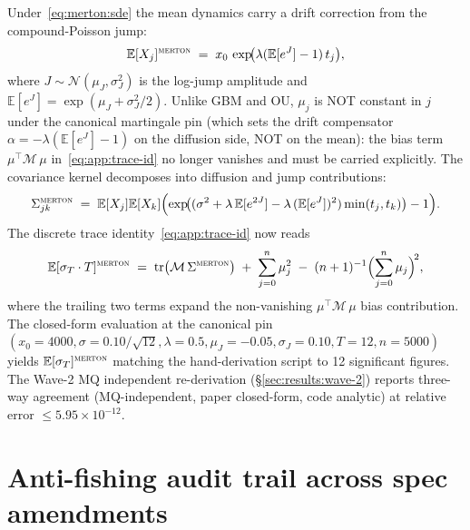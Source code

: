 \documentclass[11pt,letterpaper]{article}
\newcommand{\E}{\mathbb{E}}
\newcommand{\sigmaT}{\sigma_{T}}
\newcommand{\centerProj}{\mathcal{M}}
\begin{document}
Under~\eqref{eq:merton:sde} the mean dynamics carry a drift correction
from the compound-Poisson jump:
\begin{equation}
    \E[X_{j}]^{\textsc{merton}}
    \;=\;
    x_{0}\,\exp\!\bigl(\lambda(\E[e^{J}] - 1)\,t_{j}\bigr),
    \label{eq:app:merton-mean-j}
\end{equation}
where $J \sim \mathcal{N}(\mu_{J}, \sigma_{J}^{2})$ is the log-jump
amplitude and $\E[e^{J}] = \exp(\mu_{J} + \sigma_{J}^{2}/2)$. Unlike
GBM and OU, $\mu_{j}$ is NOT constant in $j$ under the canonical
martingale pin (which sets the drift compensator
$\alpha = -\lambda(\E[e^{J}] - 1)$ on the diffusion side, NOT on the
mean): the bias term $\mu^{\top}\centerProj\,\mu$ in~\eqref{eq:app:trace-id}
no longer vanishes and must be carried explicitly. The covariance
kernel decomposes into diffusion and jump contributions:
\begin{equation}
    \Sigma_{jk}^{\textsc{merton}}
    \;=\;
    \E[X_{j}]\E[X_{k}]\Bigl(
        \exp\!\bigl((\sigma^{2} + \lambda\,\E[e^{2J}] - \lambda\,(\E[e^{J}])^{2})\min(t_{j}, t_{k})\bigr) - 1
    \Bigr).
    \label{eq:app:merton-Sigma}
\end{equation}
The discrete trace identity~\eqref{eq:app:trace-id} now reads
\begin{equation}
    \E[\sigmaT \cdot T]^{\textsc{merton}}
    \;=\;
    \mathrm{tr}\bigl(\centerProj\,\Sigma^{\textsc{merton}}\bigr)
    \;+\;
    \sum_{j=0}^{n} \mu_{j}^{2}
    \;-\; (n+1)^{-1}\Bigl(\sum_{j=0}^{n} \mu_{j}\Bigr)^{\!2},
    \label{eq:app:merton-mean}
\end{equation}
where the trailing two terms expand the non-vanishing
$\mu^{\top}\centerProj\,\mu$ bias contribution. The closed-form
evaluation at the canonical pin
$(x_{0} = 4000, \sigma = 0.10/\sqrt{12}, \lambda = 0.5, \mu_{J} = -0.05, \sigma_{J} = 0.10, T = 12, n = 5000)$
yields $\E[\sigmaT]^{\textsc{merton}}$ matching the hand-derivation
script to 12 significant figures. The Wave-2 MQ independent
re-derivation (\S\ref{sec:results:wave-2}) reports three-way agreement
(MQ-independent, paper closed-form, code analytic) at relative error
$\leq 5.95 \times 10^{-12}$.

\section{Anti-fishing audit trail across spec amendments}
\label{app:antifishing}
\end{document}
